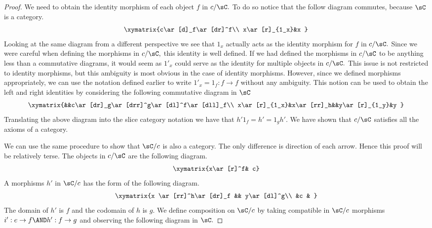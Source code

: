 \documentclass[../../main]{subfiles}
\begin{document}
\begin{proof}
	We need to obtain the identity morphism of each object \(f\) in
	\(c/\sC.\) To do so notice that the follow diagram commutes, because
	\(\sC\) is a category.
	\[ \xymatrix{c\ar[d]_f\ar[dr]^f\\ x\ar[r]_{1_x}&x } \]
	Looking at the same diagram from a different perspective we see that
	\(1_x\) actually acts as the identity morphism for \(f\) in \(c/\sC.\)
	Since we were careful when defining the morphisms in \(c/\sC,\) this
	identity is well defined. If we had defined the morphisms in \(c/\sC\)
	to be anything less than a commutative diagrams, it would seem as
	\(1'_x\) could serve as the identity for multiple objects in \(c/\sC.\)
	This issue is not restricted to identity morphisms, but this ambiguity is most
	obvious in the case of identity morphisms. However, since we defined
	morphisms appropriately, we can use the notation defined earlier to write
	\(1'_{x}=1_{f}:f\to f\) without any ambiguity. This notion can be used to
	obtain the left and right identities by considering the following
	commutative diagram in \(\sC\)
	\[\xymatrix{&&c\ar[dr]_g\ar[drr]^g\ar[dl]^f\ar[dll]_f\\
	x\ar[r]_{1_x}&x\ar[rr]_h&&y\ar[r]_{1_y}&y }\]
	Translating the above diagram into the slice category notation we have
	that \(h'1_{f}= h'=1_{g}h'.\) We have shown that \(c/\sC\) satisfies all
	the axioms of a category.

	We can use the same procedure to show that \(\sC/c\) is also a category.
	The only difference is direction of each arrow. Hence this proof will be
	relatively terse. The objects in \(c/\sC\) are the following diagram.
	\[\xymatrix{x\ar[r]^f& c}\]
	A morphisms  \(h'\) in \(\sC/c\) has the form of the following diagram.
	\[\xymatrix{x \ar[rr]^h\ar[dr]_f && y\ar[dl]^g\\ &c & }\]
	The domain of \(h'\) is \(f\) and the codomain of \(h\) is \(g.\) We
	define composition on \(\sC/c\) by taking compatible in \(\sC/c\)
	morphisms \(i':e\to f\AND h':f\to g\) and observing the following
	diagram in \(\sC.\)


\end{proof}
\end{document}
